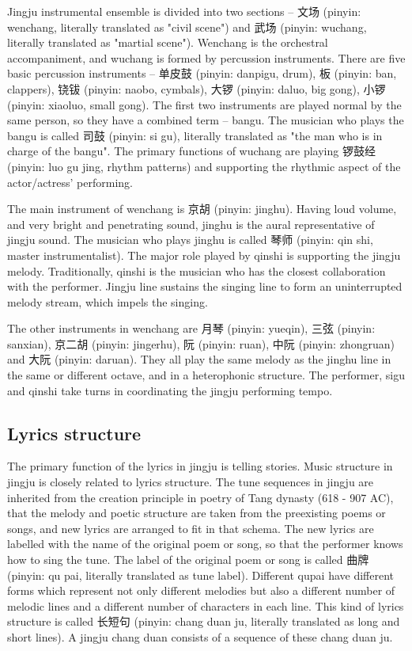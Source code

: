 Jingju instrumental ensemble is divided into two sections -- 文场 (pinyin: wenchang, literally translated as "civil scene") and 武场 (pinyin: wuchang, literally translated as "martial scene"). Wenchang is the orchestral accompaniment, and wuchang is formed by percussion instruments. There are five basic percussion instruments -- 单皮鼓 (pinyin: danpigu, drum), 板 (pinyin: ban, clappers), 铙钹 (pinyin: naobo, cymbals), 大锣 (pinyin: daluo, big gong), 小锣 (pinyin: xiaoluo, small gong). The first two instruments are played normal by the same person, so they have a combined term -- bangu. The musician who plays the bangu is called 司鼓 (pinyin: si gu), literally translated as "the man who is in charge of the bangu". The primary functions of wuchang are playing 锣鼓经 (pinyin: luo gu jing, rhythm patterns) and supporting the rhythmic aspect of the actor/actress’ performing.

The main instrument of wenchang is 京胡 (pinyin: jinghu). Having loud volume, and very bright and penetrating sound, jinghu is the aural representative of jingju sound. The musician who plays jinghu is called 琴师 (pinyin: qin shi, master instrumentalist). The major role played by qinshi is supporting the jingju melody. Traditionally, qinshi is the musician who has the closest collaboration with the performer. Jingju line sustains the singing line to form an uninterrupted melody stream, which impels the singing. 

The other instruments in wenchang are 月琴 (pinyin: yueqin), 三弦 (pinyin: sanxian), 京二胡 (pinyin: jingerhu), 阮 (pinyin: ruan), 中阮 (pinyin: zhongruan) and 大阮 (pinyin: daruan). They all play the same melody as the jinghu line in the same or different octave, and in a heterophonic structure. The performer, sigu and qinshi take turns in coordinating the jingju performing tempo.

\subsection{Lyrics structure}

The primary function of the lyrics in jingju is telling stories. Music structure in jingju is closely related to lyrics structure. The tune sequences in jingju are inherited from the creation principle in poetry of Tang dynasty (618 - 907 AC), that the melody and poetic structure are taken from the preexisting poems or songs, and new lyrics are arranged to fit in that schema. The new lyrics are labelled with the name of the original poem or song, so that the performer knows how to sing the tune. The label of the original poem or song is called 曲牌 (pinyin: qu pai, literally translated as tune label). Different qupai have different forms which represent not only different melodies but also a different number of melodic lines and a different number of characters in each line. This kind of lyrics structure is called 长短句 (pinyin: chang duan ju, literally translated as long and short lines). A jingju chang duan consists of a sequence of these chang duan ju.

